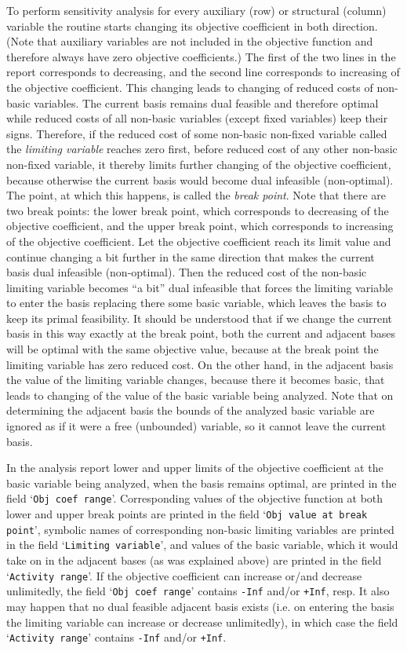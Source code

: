 To perform sensitivity analysis for every auxiliary (row) or structural
(column) variable the routine starts changing its objective coefficient
in both direction. (Note that auxiliary variables are not included in
the objective function and therefore always have zero objective
coefficients.) The first of the two lines in the report corresponds to
decreasing, and the second line corresponds to increasing of the
objective coefficient. This changing leads to changing of reduced costs
of non-basic variables. The current basis remains dual feasible and
therefore optimal while reduced costs of all non-basic variables
(except fixed variables) keep their signs. Therefore, if the reduced
cost of some non-basic non-fixed variable called the {\it limiting
variable} reaches zero first, before reduced cost of any other
non-basic non-fixed variable, it thereby limits further changing of the
objective coefficient, because otherwise the current basis would become
dual infeasible (non-optimal). The point, at which this happens, is
called the {\it break point}. Note that there are two break points: the
lower break point, which corresponds to decreasing of the objective
coefficient, and the upper break point, which corresponds to increasing
of the objective coefficient. Let the objective coefficient reach its
limit value and continue changing a bit further in the same direction
that makes the current basis dual infeasible (non-optimal). Then the
reduced cost of the non-basic limiting variable becomes ``a bit'' dual
infeasible that forces the limiting variable to enter the basis
replacing there some basic variable, which leaves the basis to keep its
primal feasibility. It should be understood that if we change the
current basis in this way exactly at the break point, both the current
and adjacent bases will be optimal with the same objective value,
because at the break point the limiting variable has zero reduced cost.
On the other hand, in the adjacent basis the value of the limiting
variable changes, because there it becomes basic, that leads to
changing of the value of the basic variable being analyzed. Note that
on determining the adjacent basis the bounds of the analyzed basic
variable are ignored as if it were a free (unbounded) variable, so it
cannot leave the current basis.

In the analysis report lower and upper limits of the objective
coefficient at the basic variable being analyzed, when the basis
remains optimal, are printed in the field `{\tt Obj coef range}'.
Corresponding values of the objective function at both lower and upper
break points are printed in the field `{\tt Obj value at break point}',
symbolic names of corresponding non-basic limiting variables are
printed in the field `{\tt Limiting variable}', and values of the basic
variable, which it would take on in the adjacent bases (as was
explained above) are printed in the field `{\tt Activity range}'.
If the objective coefficient can increase or/and decrease unlimitedly,
the field `{\tt Obj coef range}' contains {\tt -Inf} and/or {\tt +Inf},
resp. It also may happen that no dual feasible adjacent basis exists
(i.e. on entering the basis the limiting variable can increase or
decrease unlimitedly), in which case the field `{\tt Activity range}'
contains {\tt -Inf} and/or {\tt +Inf}.

